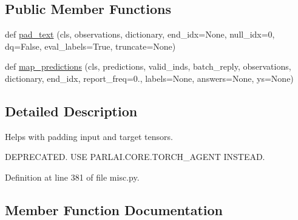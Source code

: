 \subsection*{Public Member Functions}
\begin{DoxyCompactItemize}
\item 
def \hyperlink{classparlai_1_1utils_1_1misc_1_1PaddingUtils_acd7178452139c55dc56e9889b10347cc}{pad\+\_\+text} (cls, observations, dictionary, end\+\_\+idx=None, null\+\_\+idx=0, dq=False, eval\+\_\+labels=True, truncate=None)
\item 
def \hyperlink{classparlai_1_1utils_1_1misc_1_1PaddingUtils_ae862960e8f261ff4088d5dedbe42a25c}{map\+\_\+predictions} (cls, predictions, valid\+\_\+inds, batch\+\_\+reply, observations, dictionary, end\+\_\+idx, report\+\_\+freq=0., labels=None, answers=None, ys=None)
\end{DoxyCompactItemize}


\subsection{Detailed Description}
\begin{DoxyVerb}Helps with padding input and target tensors.

DEPRECATED. USE PARLAI.CORE.TORCH_AGENT INSTEAD.
\end{DoxyVerb}
 

Definition at line 381 of file misc.\+py.



\subsection{Member Function Documentation}
\mbox{\label{classparlai_1_1utils_1_1misc_1_1PaddingUtils_ae862960e8f261ff4088d5dedbe42a25c}} 
